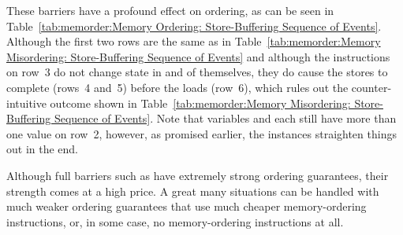 These barriers have a profound effect on ordering, as can be seen in
Table~\ref{tab:memorder:Memory Ordering: Store-Buffering Sequence of Events}.
Although the first two rows are the same as in
Table~\ref{tab:memorder:Memory Misordering: Store-Buffering Sequence of Events}
and although the  instructions on row~3
do not change state
in and of themselves, they do cause the stores to complete
(rows~4 and~5) before the
loads (row~6), which rules out the counter-intuitive outcome shown in
Table~\ref{tab:memorder:Memory Misordering: Store-Buffering Sequence of Events}.
Note that variables  and  each still have more than one
value on row~2, however, as promised earlier, the 
instances straighten things out in the end.

Although full barriers such as  have extremely strong
ordering guarantees, their strength comes at a high price.
A great many situations can be handled with much weaker ordering guarantees
that use much cheaper memory-ordering instructions, or, in some case, no
memory-ordering instructions at all.

